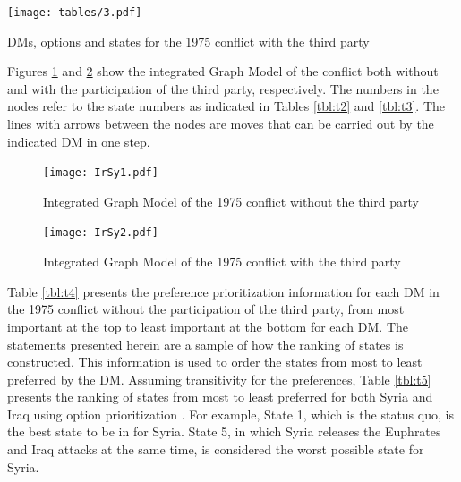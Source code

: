 \documentclass[letterpaper,12pt,titlepage,oneside,final]{book}
\begin{document}
\begin{table}[H]
\centering
\texttt{[image: tables/3.pdf]}

\caption{DMs, options and states for the 1975 conflict with the third party}

\label{tbl:t3}
\end{table}

Figures \ref{fig:IrSyGM} and \ref{fig:IrSyGM2} show the integrated Graph Model of the conflict both without and with the participation of the third party, respectively. The numbers in the nodes refer to the state numbers as indicated in Tables \ref{tbl:t2} and \ref{tbl:t3}. The lines with arrows between the nodes are moves that can be carried out by the indicated DM in one step. 

\begin{center}
\begin{figure}[H]
\centering
\texttt{[image: IrSy1.pdf]}

\caption{Integrated Graph Model of the 1975 conflict without the third party}

\label{fig:IrSyGM}
\end{figure}
\end{center}

\begin{center}
\begin{figure}[H]
\centering
\texttt{[image: IrSy2.pdf]}

\caption{Integrated Graph Model of the 1975 conflict with the third party}

\label{fig:IrSyGM2}
\end{figure}
\end{center}

Table \ref{tbl:t4} presents the preference prioritization information for each DM in the 1975 conflict without the participation of the third party, from most important at the top to least important at the bottom for each DM. The statements presented herein are a sample of how the ranking of states is constructed. This information is used to order the states from most to least preferred by the DM. Assuming transitivity for the preferences, Table \ref{tbl:t5} presents the ranking of states from most to least preferred for both Syria and Iraq using option prioritization \citep{hipel1997decision,fang2003a,fang2003b}. For example, State 1, which is the status quo, is the best state to be in for Syria. State 5, in which Syria releases the Euphrates and Iraq attacks at the same time, is considered the worst possible state for Syria.
\end{document}

